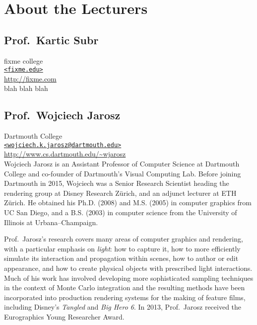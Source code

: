 \documentclass[11pt,fleqn]{book} %
\begin{document}
\section*{About the Lecturers}

\subsection*{Prof.\ Kartic Subr}
fixme college\\
\href{mailto:fixme}{\texttt{<fixme.edu>}}\\
\url{http://fixme.com}\\

blah blah blah

\bigskip

\subsection*{Prof.\ Wojciech Jarosz}
Dartmouth College\\
\href{mailto:wojciech.k.jarosz@dartmouth.edu}{\texttt{<wojciech.k.jarosz@dartmouth.edu>}}\\
\url{http://www.cs.dartmouth.edu/~wjarosz}\\

Wojciech Jarosz is an Assistant Professor of Computer Science at Dartmouth College and co-founder of Dartmouth's Visual Computing Lab. Before joining Dartmouth in 2015, Wojciech was a Senior Research Scientist heading the rendering group at Disney Research Zürich, and an adjunct lecturer at ETH Zürich. He obtained his Ph.D. (2008) and M.S. (2005) in computer graphics from UC San Diego, and a B.S. (2003) in computer science from the University of Illinois at Urbana–Champaign.

Prof.\ Jarosz’s research covers many areas of computer graphics and rendering, with a particular emphasis on \emph{light}: how to capture it, how to more efficiently simulate its interaction and propagation within scenes, how to author or edit appearance, and how to create physical objects with prescribed light interactions. Much of his work has involved developing more sophisticated sampling techniques in the context of Monte Carlo integration and the resulting methods have been incorporated into production rendering systems for the making of feature films, including Disney's \textit{Tangled} and \textit{Big Hero 6}. In 2013, Prof.\ Jarosz received the Eurographics Young Researcher Award.

\bigskip
\end{document}
